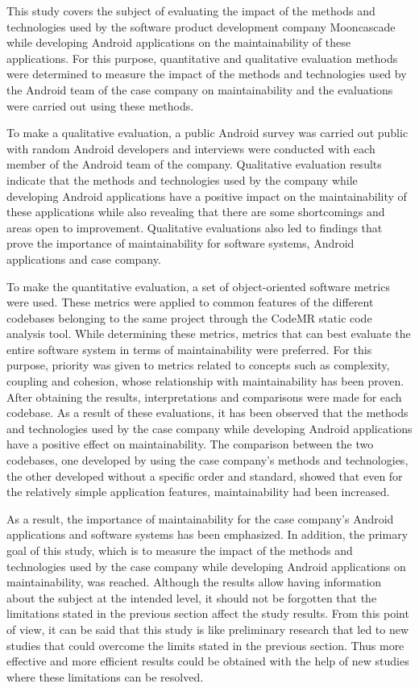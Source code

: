 This study covers the subject of evaluating the impact of the methods and technologies used by the software product development company Mooncascade while developing Android applications on the maintainability of these applications. For this purpose, quantitative and qualitative evaluation methods were determined to measure the impact of the methods and technologies used by the Android team of the case company on maintainability and the evaluations were carried out using these methods.

To make a qualitative evaluation, a public Android survey was carried out public with random Android developers and interviews were conducted with each member of the Android team of the company. Qualitative evaluation results indicate that the methods and technologies used by the company while developing Android applications have a positive impact on the maintainability of these applications while also revealing that there are some shortcomings and areas open to improvement. Qualitative evaluations also led to findings that prove the importance of maintainability for software systems, Android applications and case company.

To make the quantitative evaluation, a set of object-oriented software metrics were used. These metrics were applied to common features of the different codebases belonging to the same project through the CodeMR static code analysis tool. While determining these metrics, metrics that can best evaluate the entire software system in terms of maintainability were preferred. For this purpose, priority was given to metrics related to concepts such as complexity, coupling and cohesion, whose relationship with maintainability has been proven. After obtaining the results, interpretations and comparisons were made for each codebase. As a result of these evaluations, it has been observed that the methods and technologies used by the case company while developing Android applications have a positive effect on maintainability. The comparison between the two codebases, one developed by using the case company's methods and technologies, the other developed without a specific order and standard, showed that even for the relatively simple application features, maintainability had been increased.

As a result, the importance of maintainability for the case company's Android applications and software systems has been emphasized. In addition, the primary goal of this study, which is to measure the impact of the methods and technologies used by the case company while developing Android applications on maintainability, was reached. Although the results allow having information about the subject at the intended level, it should not be forgotten that the limitations stated in the previous section affect the study results. From this point of view, it can be said that this study is like preliminary research that led to new studies that could overcome the limits stated in the previous section. Thus more effective and more efficient results could be obtained with the help of new studies where these limitations can be resolved.